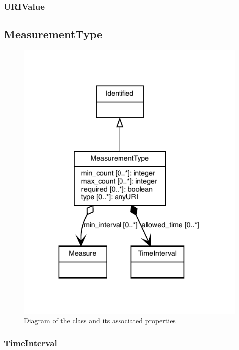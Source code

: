 \subsubsection{URIValue}
\label{sec:URIValue}



\subsection{MeasurementType}
\label{sec:MeasurementType}

\begin{figure}[ht]
\begin{center}
\includegraphics[scale=0.8]{figures/MeasurementType}
\caption[]{Diagram of the  class and its associated properties}
\label{uml:MeasurementType}
\end{center}
\end{figure}

\subsubsection{TimeInterval}
\label{sec:TimeInterval}

